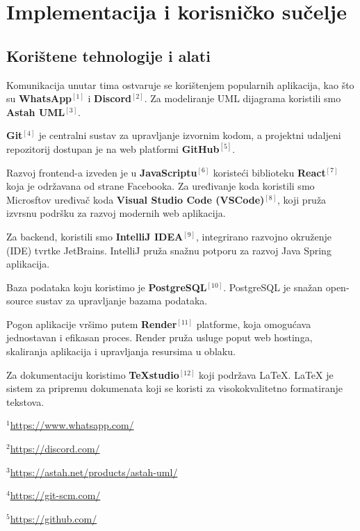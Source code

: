 \chapter{Implementacija i korisničko sučelje}
		
		
		\section{Korištene tehnologije i alati}
			 		
			Komunikacija unutar tima ostvaruje se korištenjem popularnih aplikacija, kao što su \textbf{WhatsApp}$^{[1]}$ i \textbf{Discord}$^{[2]}$. Za modeliranje UML dijagrama koristili smo \textbf{Astah UML}$^{[3]}$.
			
			\textbf{Git}$^{[4]}$ je centralni sustav za upravljanje izvornim kodom, a projektni udaljeni repozitorij dostupan je na web platformi \textbf{GitHub}$^{[5]}$.
			
			Razvoj frontend-a izveden je u \textbf{JavaScriptu}$^{[6]}$ koristeći biblioteku \textbf{React}$^{[7]}$ koja je održavana od strane Facebooka. Za uređivanje koda koristili smo Microsftov uređivač koda \textbf{Visual Studio Code (VSCode)}$^{[8]}$, koji pruža izvrsnu podršku za razvoj modernih web aplikacija.
			
			Za backend, koristili smo \textbf{IntelliJ IDEA}$^{[9]}$, integrirano razvojno okruženje (IDE) tvrtke JetBrains. IntelliJ pruža snažnu potporu za razvoj Java Spring aplikacija.
			
			Baza podataka koju koristimo je \textbf{PostgreSQL}$^{[10]}$. PostgreSQL je snažan open-source sustav za upravljanje bazama podataka.
			
			Pogon aplikacije vršimo putem \textbf{Render}$^{[11]}$ platforme, koja omogućava jednostavan i efikasan proces. Render pruža usluge poput web hostinga, skaliranja aplikacija i upravljanja resursima u oblaku.
			
			Za dokumentaciju koristimo \textbf{TeXstudio}$^{[12]}$ koji podržava LaTeX. LaTeX je sistem za pripremu dokumenata koji se koristi za visokokvalitetno formatiranje tekstova.
			
			$^{1}$\url{https://www.whatsapp.com/}
			
			$^{2}$\url{https://discord.com/}
			
			$^{3}$\url{https://astah.net/products/astah-uml/}
			
			$^{4}$\url{https://git-scm.com/}
			
			$^{5}$\url{https://github.com/}
			
